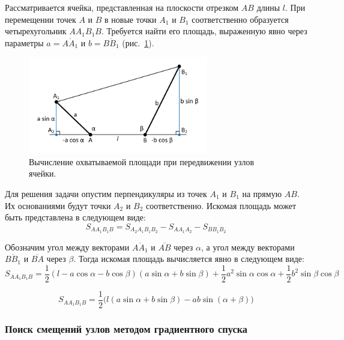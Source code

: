 Рассматривается ячейка, представленная на плоскости отрезком $AB$ длины $l$.
При перемещении точек $A$ и $B$ в новые точки $A_1$ и $B_1$ соответственно образуется четырехугольник $AA_1B_1B$.
Требуется найти его площадь, выраженную явно через параметры $a = \overline{AA_1}$ и $b = \overline{BB_1}$ (рис.~\ref{fig:text_1_remesh_2d_local}).

\begin{figure}[h]
\onelinecaptionstrue
\centering
\includegraphics[width=0.7\textwidth]{pics/text_1_remesh_2d/local.pdf}
\caption{Вычисление охватываемой площади при передвижении узлов ячейки.}
\label{fig:text_1_remesh_2d_local}
\end{figure}

Для решения задачи опустим перпендикуляры из точек $A_1$ и $B_1$ на прямую $AB$.
Их основаниями будут точки $A_2$ и $B_2$ соответственно.
Искомая площадь может быть представлена в следующем виде:
\begin{equation}
S_{AA_1B_1B} = S_{A_2A_1B_1B_2} - S_{AA_1A_2} - S_{BB_1B_2}
\end{equation}

Обозначим угол между векторами $\overline{AA_1}$ и $\overline{AB}$ через $\alpha$, а угол между векторами $\overline{BB_1}$ и $\overline{BA}$ через $\beta$.
Тогда искомая площадь вычисляется явно в следующем виде:
\begin{equation}
S_{AA_1B_1B} = \frac{1}{2}(l - a \cos \alpha - b \cos \beta)(a \sin \alpha + b \sin \beta) + \frac{1}{2}a^2 \sin \alpha \cos \alpha + \frac{1}{2}b^2 \sin \beta \cos \beta
\end{equation}

\begin{equation}
S_{AA_1B_1B} = \frac{1}{2}\big(l(a \sin \alpha + b \sin \beta) - ab \sin(\alpha + \beta)\big)
\end{equation}

\subsubsection{Поиск смещений узлов методом градиентного спуска}

